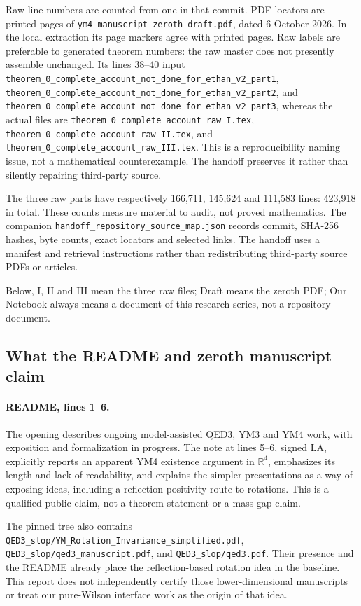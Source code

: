 \documentclass[11pt]{article}
\providecommand{\hrbpath}[1]{\nolinkurl{#1}}
\theoremstyle{remark}
\begin{document}
Raw line numbers are counted from one in that commit.
PDF locators are printed pages of
\hrbpath{ym4_manuscript_zeroth_draft.pdf}, dated 6 October 2026.
In the local extraction its page markers agree with printed
pages. Raw labels are preferable to generated theorem numbers:
the raw master does not presently assemble unchanged.
Its lines 38--40 input
\hrbpath{theorem_0_complete_account_not_done_for_ethan_v2_part1},
\hrbpath{theorem_0_complete_account_not_done_for_ethan_v2_part2},
and \hrbpath{theorem_0_complete_account_not_done_for_ethan_v2_part3},
whereas the actual files are
\hrbpath{theorem_0_complete_account_raw_I.tex},
\hrbpath{theorem_0_complete_account_raw_II.tex}, and
\hrbpath{theorem_0_complete_account_raw_III.tex}.
This is a reproducibility naming issue, not a mathematical
counterexample. The handoff preserves it rather than silently
repairing third-party source.

The three raw parts have respectively 166,711, 145,624 and
111,583 lines: 423,918 in total. These counts measure material
to audit, not proved mathematics. The companion
\hrbpath{handoff_repository_source_map.json} records commit,
SHA-256 hashes, byte counts, exact locators and selected links.
The handoff uses a manifest and retrieval instructions rather
than redistributing third-party source PDFs or articles.

Below, I, II and III mean the three raw files; Draft means
the zeroth PDF; Our Notebook always means a document of
this research series, not a repository document.

\subsection{What the README and zeroth manuscript claim}
\label{hrb-claims}

\paragraph{README, lines 1--6.}
The opening describes ongoing model-assisted QED3, YM3 and
YM4 work, with exposition and formalization in progress.
The note at lines 5--6, signed LA, explicitly reports an
apparent YM4 existence argument in \(\mathbb R^4\), emphasizes
its length and lack of readability, and explains the simpler
presentations as a way of exposing ideas, including a
reflection-positivity route to rotations. This is a qualified
public claim, not a theorem statement or a mass-gap claim.

The pinned tree also contains
\hrbpath{QED3_slop/YM_Rotation_Invariance_simplified.pdf},
\hrbpath{QED3_slop/qed3_manuscript.pdf}, and
\hrbpath{QED3_slop/qed3.pdf}. Their presence and the
README already place the reflection-based rotation
idea in the baseline. This report does not independently
certify those lower-dimensional manuscripts or treat
our pure-Wilson interface work as the origin of that idea.
\end{document}
